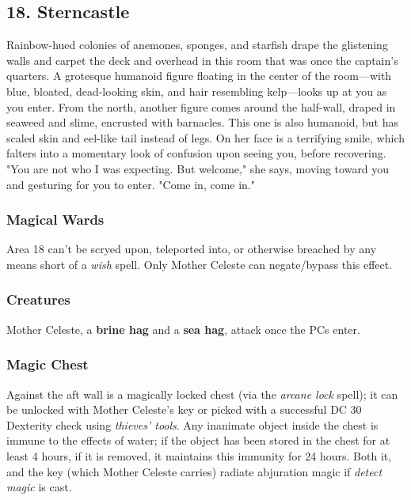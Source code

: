 \documentclass[10pt,a4paper,twoside,bg=print,twocolumn,openany,nodeprecatedcode]{dndbook}
\begin{document}
\subsection{18. Sterncastle}
\begin{DndReadAloud}{}
Rainbow-hued colonies of anemones, sponges, and starfish drape the glistening walls and carpet the deck and overhead in this room that was once the captain's quarters. A grotesque humanoid figure floating in the center of the room—with blue, bloated, dead-looking skin, and hair resembling kelp—looks up at you as you enter. From the north, another figure comes around the half-wall, draped in seaweed and slime, encrusted with barnacles. This one is also humanoid, but has scaled skin and eel-like tail instead of legs. On her face is a terrifying smile, which falters into a momentary look of confusion upon seeing you, before recovering. "You are not who I was expecting. But welcome," she says, moving toward you and gesturing for you to enter. "Come in, come in."

\end{DndReadAloud}

\subsubsection{Magical Wards}
Area 18 can't be scryed upon, teleported into, or otherwise breached by any means short of a \textit{wish} spell. Only Mother Celeste can negate/bypass this effect.

\subsubsection{Creatures}
Mother Celeste, a \textbf{brine hag} and a \textbf{sea hag}, attack once the PCs enter.

\subsubsection{Magic Chest}
Against the aft wall is a magically locked chest (via the \textit{arcane lock} spell); it can be unlocked with Mother Celeste's key or picked with a successful DC 30 Dexterity check using \textit{thieves' tools}. Any inanimate object inside the chest is immune to the effects of water; if the object has been stored in the chest for at least 4 hours, if it is removed, it maintains this immunity for 24 hours. Both it, and the key (which Mother Celeste carries) radiate abjuration magic if \textit{detect magic} is cast.
\end{document}

